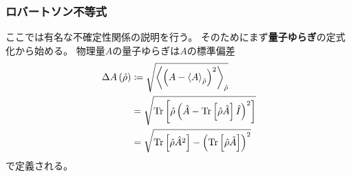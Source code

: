 \documentclass[a4paper, 10pt, uplatex]{jsarticle}
\begin{document}
\subsubsection{ロバートソン不等式}
ここでは有名な不確定性関係の説明を行う。
そのためにまず\textbf{量子ゆらぎ}の定式化から始める。
物理量$A$の量子ゆらぎは$A$の標準偏差
\begin{align}
	\Delta A \left( \hat{\rho} \right)
	&\coloneqq \sqrt{\Braket{\left( A
	- \Braket{A}_{\hat{\rho}} \right)^2}_{\hat{\rho}}} \\
	&= \sqrt{\operatorname*{Tr} \left[ \hat{\rho} \left( \hat{A}
	- \operatorname*{Tr} \left[ \hat{\rho} \hat{A} \right] \hat{I} \right)^2 \right]} \\
	&= \sqrt{\operatorname*{Tr} \left[ \hat{\rho} \hat{A}^2 \right]
	- \left( \operatorname*{Tr} \left[ \hat{\rho} \hat{A} \right] \right)^2}
\end{align}
で定義される。
\end{document}
